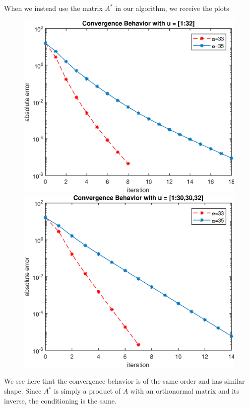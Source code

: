 \documentclass[12pt]{article}
\begin{document}
When we instead use the matrix $ A^* $ in our algorithm, we receive the plots
\begin{figure}[H]
	\centering
	\begin{minipage}[b]{0.4\textwidth}
		\includegraphics[width=\textwidth]{hw3p4p3.eps}
	\end{minipage}
	\hfill
	\begin{minipage}[b]{0.4\textwidth}
		\includegraphics[width=\textwidth]{hw3p4p4.eps}
	\end{minipage}
\end{figure}
We see here that the convergence behavior is of the same order and has similar shape. Since $ A^* $ is simply a product of $ A $ with an orthonormal matrix and its inverse, the conditioning is the same. 
\end{document}
